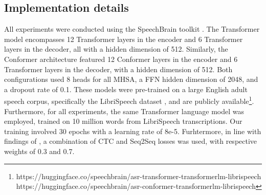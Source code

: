 \subsection{Implementation details}

All experiments were conducted using the SpeechBrain toolkit \cite{speechbrain}. The Transformer model encompasses 12 Transformer layers in the encoder and 6 Transformer layers in the decoder, all with a hidden dimension of 512. Similarly, the Conformer architecture featured 12 Conformer layers in the encoder and 6 Transformer layers in the decoder, with a hidden dimension of 512. Both configurations used 8 heads for all MHSA, a FFN hidden dimension of 2048, and a dropout rate of 0.1. These models were pre-trained on a large English adult speech corpus, specifically the LibriSpeech dataset \cite{librispeech}, and are publicly available\footnote{https://huggingface.co/speechbrain/asr-transformer-transformerlm-librispeech\\ https://huggingface.co/speechbrain/asr-conformer-transformerlm-librispeech}. Furthermore, for all experiments, the same Transformer language model was employed, trained on 10 million words from LibriSpeech transcriptions. Our training involved 30 epochs with a learning rate of 8e-5. Furhtermore, in line with findings of \cite{gelin2021endtoend}, a combination of CTC and Seq2Seq losses was used, with respective weights of 0.3 and 0.7.


